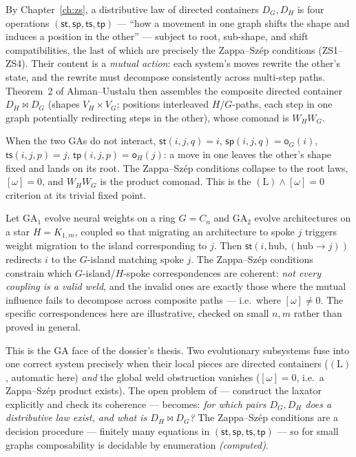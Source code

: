 By Chapter~\ref{ch:zs}, a distributive law of directed containers $D_G,D_H$ is
four operations $(\mathsf{st},\mathsf{sp},\mathsf{ts},\mathsf{tp})$ ---
``how a movement in one graph shifts the shape and induces a position in the
other'' --- subject to root, sub-shape, and shift compatibilities, the last of
which are precisely the Zappa--Sz\'ep conditions (ZS1--ZS4). Their content is a
\emph{mutual action}: each system's moves rewrite the other's state, and the
rewrite must decompose consistently across multi-step paths. Theorem~2 of
Ahman--Uustalu then assembles the composite directed container $D_H\bowtie D_G$
(shapes $V_H\times V_G$; positions interleaved $H$/$G$-paths, each step in one
graph potentially redirecting steps in the other), whose comonad is $W_H W_G$.

\begin{example}
\label{ex:ga-independent}
When the two GAs do not interact,
$\mathsf{st}(i,j,q)=i$, $\mathsf{sp}(i,j,q)=\mathsf{o}_G(i)$,
$\mathsf{ts}(i,j,p)=j$, $\mathsf{tp}(i,j,p)=\mathsf{o}_H(j)$: a move in one leaves
the other's shape fixed and lands on its root. The Zappa--Sz\'ep conditions
collapse to the root laws, $[\omega]=0$, and $W_H W_G$ is the product comonad.
This is the $(\mathrm{L})\wedge[\omega]=0$ criterion at its trivial fixed point.
\end{example}

\begin{example}
\label{ex:ga-coupled}
Let GA$_1$ evolve neural weights on a ring $G=C_n$ and GA$_2$ evolve
architectures on a star $H=K_{1,m}$, coupled so that migrating an architecture
to spoke $j$ triggers weight migration to the island corresponding to $j$. Then
$\mathsf{st}(i,\mathrm{hub},(\mathrm{hub}\to j))$ redirects $i$ to the $G$-island
matching spoke $j$. The Zappa--Sz\'ep conditions constrain which
$G$-island/$H$-spoke correspondences are coherent: \emph{not every coupling is a
valid weld}, and the invalid ones are exactly those where the mutual influence
fails to decompose across composite paths --- i.e.\ where $[\omega]\neq0$. The
specific correspondences here are illustrative, checked on small $n,m$ rather
than proved in general.
\end{example}

This is the GA face of the dossier's thesis. Two evolutionary subsystems fuse
into one correct system precisely when their local pieces are directed
containers ($(\mathrm{L})$, automatic here) \emph{and} the global weld
obstruction vanishes ($[\omega]=0$, i.e.\ a Zappa--Sz\'ep product exists). The
open problem of \cite{langer-va-ga} --- construct the laxator explicitly and
check its coherence --- becomes: \emph{for which pairs $D_G,D_H$ does a
distributive law exist, and what is $D_H\bowtie D_G$?} The Zappa--Sz\'ep
conditions are a decision procedure --- finitely many equations in
$(\mathsf{st},\mathsf{sp},\mathsf{ts},\mathsf{tp})$ --- so for small graphs
composability is decidable by enumeration \emph{(computed)}.

